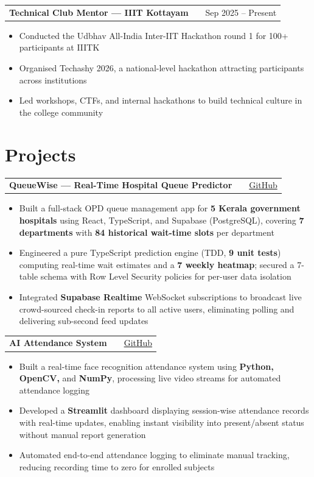 \documentclass[a4paper,11pt]{article}  %
\makeatletter
\newenvironment{joblong}[2]
    {
    \begin{tabularx}{\linewidth}{@{}l X r@{}}
    \textbf{#1} & \hfill & #2 \\[3.75pt]
    \end{tabularx}
    \begin{minipage}[t]{\linewidth}
    \begin{itemize}[nosep,after=\strut, leftmargin=1em, itemsep=3pt,label=--]
    }
    {
    \end{itemize}
    \end{minipage}
    }
\newenvironment{project}[2]
    {
    \begin{tabularx}{\linewidth}{@{}l X r@{}}
    \textbf{#1} & \hfill & #2 \\[3.75pt]
    \end{tabularx}
    \begin{minipage}[t]{\linewidth}
    \begin{itemize}[nosep,after=\strut, leftmargin=1em, itemsep=3pt,label=--]
    }
    {
    \end{itemize}
    \end{minipage}
    \vspace{4pt}   %
    }
\makeatother
\begin{document}
\begin{joblong}{Technical Club Mentor — IIIT Kottayam}{Sep 2025 -- Present}
    \item Conducted the Udbhav All-India Inter-IIT Hackathon round 1 for 100+ participants at IIITK
    \item Organised Techashy 2026, a national-level hackathon attracting participants across institutions
    \item Led workshops, CTFs, and internal hackathons to build technical culture in the college community
\end{joblong}

\section{Projects}

\begin{project}{QueueWise — Real-Time Hospital Queue Predictor}{\href{https://github.com/jugalkkt/queuewise}{GitHub}}
    \item Built a full-stack OPD queue management app for \textbf{5 Kerala government hospitals} using React, TypeScript, and Supabase (PostgreSQL), covering \textbf{7 departments} with \textbf{84 historical wait-time slots} per department
    \item Engineered a pure TypeScript prediction engine (TDD, \textbf{9 unit tests}) computing real-time wait estimates and a \textbf{7 weekly heatmap}; secured a 7-table schema with Row Level Security policies for per-user data isolation
    \item Integrated \textbf{Supabase Realtime} WebSocket subscriptions to broadcast live crowd-sourced check-in reports to all active users, eliminating polling and delivering sub-second feed updates
\end{project}

\begin{project}{AI Attendance System}{\href{https://github.com/jugalkkt/ai-attendance-system}{GitHub}}
    \item Built a real-time face recognition attendance system using \textbf{Python, OpenCV,} and \textbf{NumPy}, processing live video streams for automated attendance logging
    \item Developed a \textbf{Streamlit} dashboard displaying session-wise attendance records with real-time updates, enabling instant visibility into present/absent status without manual report generation
    \item Automated end-to-end attendance logging to eliminate manual tracking, reducing recording time to zero for enrolled subjects
\end{project}
\end{document}
